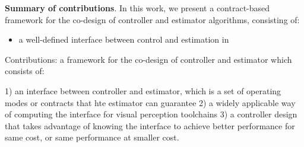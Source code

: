 \textbf{Summary of contributions}.
In this work, we present a contract-based framework for the co-design of controller and estimator algorithms, consisting of:
\begin{itemize}
	\item a well-defined interface between control and estimation in 
\end{itemize}
Contributions: 
a framework for the co-design of controller and estimator which consists of:

1) an interface between controller and estimator, which is a set of operating modes or contracts that hte estimator can guarantee
2) a widely applicable way of computing the interface for visual perception toolchains
3) a controller design that takes advantage of knowing the interface to achieve better performance for same cost, or same performance at smaller cost.



